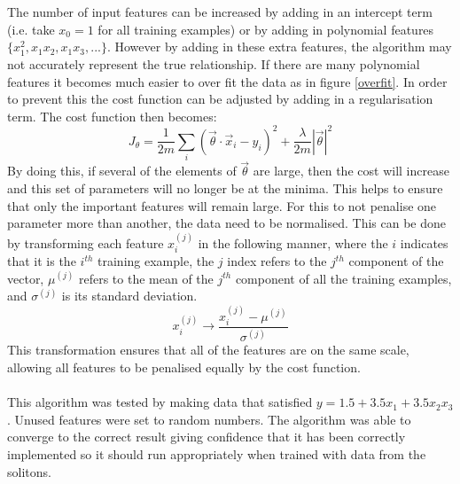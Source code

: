 \documentclass[a4paper,12pt]{report}
\begin{document}
\\\\The number of input features can be increased by adding in an intercept term (i.e. take $x_0=1$ for all training examples) or by adding in polynomial features $\{x_1^2,x_1x_2,x_1x_3, ... \}$. However by adding in these extra features, the algorithm may not accurately represent the true relationship. If there are many polynomial features it becomes much easier to over fit the data as in figure \ref{overfit}. In order to prevent this the cost function can be adjusted by adding in a regularisation term. The cost function then becomes:
$$J_\theta = \frac{1}{2m}\sum_i \left(\vec\theta\cdot \vec x_i -y_i\right)^2 +\frac{\lambda}{2m} |\vec\theta|^2$$
By doing this, if several of the elements of $\vec \theta$ are large, then the cost will increase and this set of parameters will no longer be at the minima. This helps to ensure that only the important features will remain large. For this to not penalise one parameter more than another, the data need to be normalised. This can be done by transforming each feature $x_i^{(j)}$  in the following manner, where the $i$ indicates that it is the $i^{th}$ training example, the $j$ index refers to the $j^{th}$ component of the vector, $\mu^{(j)}$ refers to the mean of the $j^{th}$ component of all the training examples, and $\sigma^{(j)}$ is its standard deviation.
$$x_i^{(j)}\rightarrow \frac{x_i^{(j)}-\mu^{(j)}}{\sigma^{(j)}}$$
This transformation ensures that all of the features are on the same scale, allowing all features to be penalised equally by the cost function. 
\\\\
This algorithm was tested by making data that satisfied $y = 1.5+3.5x_1+3.5x_2x_3$. Unused features were set to random numbers. The algorithm was able to converge to the correct result giving confidence that it has been correctly implemented so it should run appropriately when trained with data from the solitons. 
\end{document}
